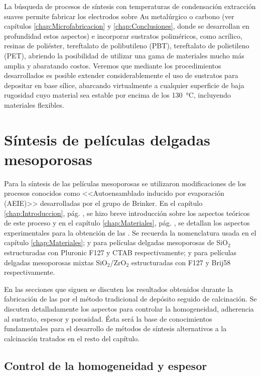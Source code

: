 	La búsqueda de procesos de síntesis con temperaturas de condensación extracción suaves permite fabricar los electrodos sobre Au metalúrgico o carbono (ver capítulos \ref{chap:Microfabricacion} y \ref{chap:Conclusiones}, donde se desarrollan en profundidad estos aspectos) e incorporar sustratos poliméricos, como acrílico, resinas de poliéster, tereftalato de polibutileno (PBT), tereftalato de polietileno (PET), abriendo la posibilidad de utilizar una gama de materiales mucho más amplia y abaratando costos. Veremos que mediante los procedimientos desarrollados es posible extender considerablemente el uso de sustratos para depositar \pdm\space en base sílice, abarcando virtualmente a cualquier superficie de baja rugosidad cuyo material sea estable por encima de los \SI{130}{\celsius}, incluyendo materiales flexibles.
	
\section{Síntesis de películas delgadas mesoporosas}
		
		Para la síntesis de las películas mesoporosas se utilizaron modificaciones de los procesos conocidos como <<Autoensamblado inducido por evaporación (AEIE)>> desarrolladas por el grupo de Brinker.\cite{Brinker1999} En el capítulo \ref{chap:Introduccion}, pág. \pageref{sec:mesoporosos}, se hizo breve introducción sobre los aspectos teóricos de este proceso y en el capítulo \ref{chap:Materiales}, pág. \pageref{sec:sintesis_mesoporosos}, se detallan los aspectos experimentales para la obtención de las \pdm. Se recuerda la nomenclatura usada en el capítulo \ref{chap:Materiales}; \pdmF\space y \pdmC\space para películas delgadas mesoporosas de SiO$_2$ estructuradas con Pluronic F127 y CTAB respectivamente; \pdmZ\space y \pdmZB\space para películas delgadas mesoporosas mixtas SiO$_2$/ZrO$_2$ estructuradas con F127 y Brij58 respectivamente.

		En las secciones que siguen se discuten los resultados obtenidos durante la fabricación de las \pdm\space por el método tradicional de depósito seguido de calcinación. Se discuten detalladamente los aspectos para controlar la homogeneidad, adherencia al sustrato, espesor y porosidad. Ésta será la base de conocimientos fundamentales para el desarrollo de métodos de síntesis alternativos a la calcinación tratados en el resto del capítulo.

		\subsection{Control de la homogeneidad y espesor}
		
